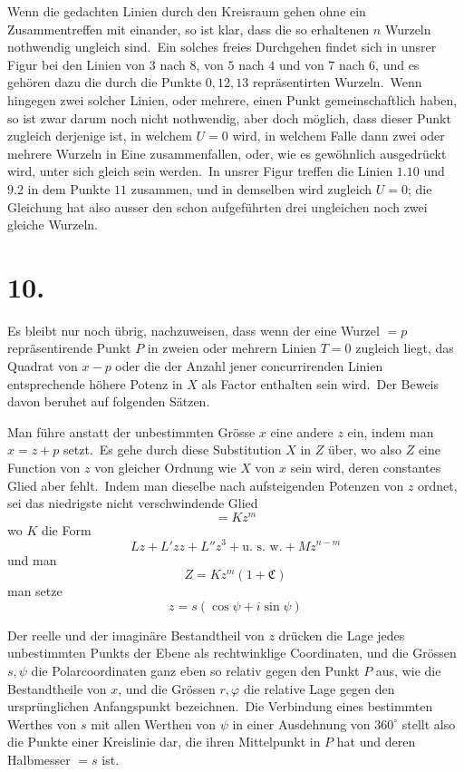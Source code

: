 \documentclass[12pt,a4paper]{article}
\theoremstyle{plain}
\begin{document}
Wenn die gedachten Linien durch den Kreisraum gehen ohne ein Zusammentreffen mit einander, so ist klar, dass die so erhaltenen $n$ Wurzeln nothwendig ungleich sind.\ Ein solches freies Durchgehen findet sich in unsrer Figur bei
den Linien von $3$ nach $8$, von $5$ nach $4$ und von $7$ nach $6$, und es gehören
dazu die durch die Punkte $0, 12, 13$ repräsentirten Wurzeln.\ Wenn hingegen
zwei solcher Linien, oder mehrere, einen Punkt gemeinschaftlich haben, so ist
zwar darum noch nicht nothwendig, aber doch möglich, dass dieser Punkt zugleich derjenige ist, in welchem $U = 0$ wird, in welchem Falle dann zwei oder mehrere Wurzeln in Eine zusammenfallen, oder, wie es gewöhnlich ausgedrückt
wird, unter sich gleich sein werden.\ In unsrer Figur treffen die Linien $1.10$
und $9.2$ in dem Punkte $11$ zusammen, und in demselben wird zugleich $U = 0$;
die Gleichung hat also ausser den schon aufgeführten drei ungleichen noch zwei
gleiche Wurzeln.

\section*{10.}

Es bleibt nur noch übrig, nachzuweisen, dass wenn der eine Wurzel $= p$
repräsentirende Punkt $P$ in zweien oder mehrern Linien $T = 0$ zugleich liegt,
das Quadrat von $x - p$ oder die der Anzahl jener concurrirenden Linien entsprechende höhere Potenz in $X$ als Factor enthalten sein wird.\ Der Beweis davon
beruhet auf folgenden Sätzen.

Man führe anstatt der unbestimmten Grösse $x$ eine andere $z$ ein, indem
man $x = z + p$ setzt.\ Es gehe durch diese Substitution $X$ in $Z$ über, wo also
$Z$ eine Function von $z$ von gleicher Ordnung wie $X$ von $x$ sein wird, deren constantes Glied aber fehlt.\ Indem man dieselbe nach aufsteigenden Potenzen von
$z$ ordnet, sei das niedrigste nicht verschwindende Glied
\[
= Kz^m
\]
wo $K$ die Form
\[
Lz + L'zz + L''z^3 + \text{u.\ s.\ w.} + Mz^{n-m}
\]
und man
\[
Z = Kz^m(1 + \mathfrak{C})
\]
man setze
\[
z = s(\cos\psi + i \sin\psi)
\]

Der reelle und der imaginäre Bestandtheil von $z$ drücken die Lage jedes
unbestimmten Punkts der Ebene als rechtwinklige Coordinaten, und die Grössen
$s, \psi$ die Polarcoordinaten ganz eben so relativ gegen den Punkt $P$ aus, wie die
Bestandtheile von $x$, und die Grössen $r, \varphi$ die relative Lage gegen den ursprünglichen Anfangspunkt bezeichnen.\ Die Verbindung eines bestimmten Werthes
von $s$ mit allen Werthen von $\psi$ in einer Ausdehnung von $360^\circ$ stellt also die
Punkte einer Kreislinie dar, die ihren Mittelpunkt in $P$ hat und deren Halbmesser $= s$ ist.
\end{document}
